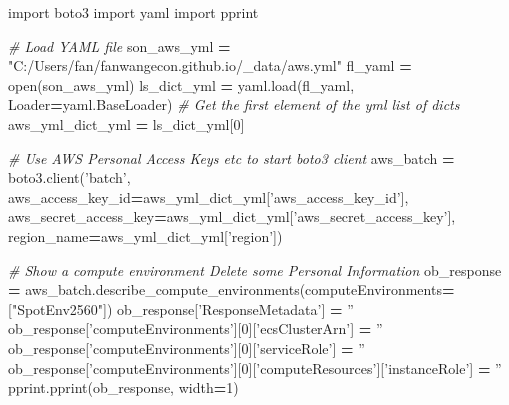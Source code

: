 \documentclass[
]{book}
\newenvironment{Shaded}{\begin{snugshade}}{\end{snugshade}}
\newcommand{\BuiltInTok}[1]{#1}
\newcommand{\CommentTok}[1]{\textcolor[rgb]{0.56,0.35,0.01}{\textit{#1}}}
\newcommand{\DecValTok}[1]{\textcolor[rgb]{0.00,0.00,0.81}{#1}}
\newcommand{\ImportTok}[1]{#1}
\newcommand{\NormalTok}[1]{#1}
\newcommand{\OperatorTok}[1]{\textcolor[rgb]{0.81,0.36,0.00}{\textbf{#1}}}
\newcommand{\StringTok}[1]{\textcolor[rgb]{0.31,0.60,0.02}{#1}}
\begin{document}
\begin{Shaded}
\begin{Highlighting}[]
\ImportTok{import}\NormalTok{ boto3}
\ImportTok{import}\NormalTok{ yaml}
\ImportTok{import}\NormalTok{ pprint}

\CommentTok{# Load YAML file}
\NormalTok{son_aws_yml }\OperatorTok{=} \StringTok{"C:/Users/fan/fanwangecon.github.io/_data/aws.yml"}
\NormalTok{fl_yaml }\OperatorTok{=} \BuiltInTok{open}\NormalTok{(son_aws_yml)}
\NormalTok{ls_dict_yml }\OperatorTok{=}\NormalTok{ yaml.load(fl_yaml, Loader}\OperatorTok{=}\NormalTok{yaml.BaseLoader)}
\CommentTok{# Get the first element of the yml list of dicts}
\NormalTok{aws_yml_dict_yml }\OperatorTok{=}\NormalTok{ ls_dict_yml[}\DecValTok{0}\NormalTok{]}

\CommentTok{# Use AWS Personal Access Keys etc to start boto3 client}
\NormalTok{aws_batch }\OperatorTok{=}\NormalTok{ boto3.client(}\StringTok{'batch'}\NormalTok{,}
\NormalTok{  aws_access_key_id}\OperatorTok{=}\NormalTok{aws_yml_dict_yml[}\StringTok{'aws_access_key_id'}\NormalTok{],}
\NormalTok{  aws_secret_access_key}\OperatorTok{=}\NormalTok{aws_yml_dict_yml[}\StringTok{'aws_secret_access_key'}\NormalTok{],}
\NormalTok{  region_name}\OperatorTok{=}\NormalTok{aws_yml_dict_yml[}\StringTok{'region'}\NormalTok{])}

\CommentTok{# Show a compute environment Delete some Personal Information}
\NormalTok{ob_response }\OperatorTok{=}\NormalTok{ aws_batch.describe_compute_environments(computeEnvironments}\OperatorTok{=}\NormalTok{[}\StringTok{"SpotEnv2560"}\NormalTok{])}
\NormalTok{ob_response[}\StringTok{'ResponseMetadata'}\NormalTok{] }\OperatorTok{=} \StringTok{''}
\NormalTok{ob_response[}\StringTok{'computeEnvironments'}\NormalTok{][}\DecValTok{0}\NormalTok{][}\StringTok{'ecsClusterArn'}\NormalTok{] }\OperatorTok{=} \StringTok{''}
\NormalTok{ob_response[}\StringTok{'computeEnvironments'}\NormalTok{][}\DecValTok{0}\NormalTok{][}\StringTok{'serviceRole'}\NormalTok{] }\OperatorTok{=} \StringTok{''}
\NormalTok{ob_response[}\StringTok{'computeEnvironments'}\NormalTok{][}\DecValTok{0}\NormalTok{][}\StringTok{'computeResources'}\NormalTok{][}\StringTok{'instanceRole'}\NormalTok{] }\OperatorTok{=} \StringTok{''}
\NormalTok{pprint.pprint(ob_response, width}\OperatorTok{=}\DecValTok{1}\NormalTok{)}
\end{Highlighting}
\end{Shaded}
\end{document}
